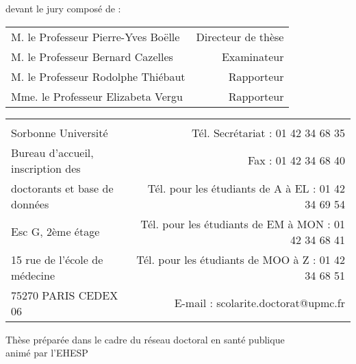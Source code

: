 \documentclass[a4paper,12pt]{book}
\numberwithin{equation}{chapter}
\numberwithin{figure}{chapter}
\numberwithin{table}{chapter}
\begin{document}
\vspace*{.6cm} 
devant le jury composé de : 
\vspace*{.1cm} 
\begin{center}

\begin{tabular}{p{10cm} r}
  M. le Professeur Pierre-Yves Boëlle & Directeur de thèse\\
  M. le Professeur Bernard Cazelles & Examinateur  \\
  M. le Professeur Rodolphe Thiébaut & Rapporteur  \\
  Mme. le Professeur Elizabeta Vergu & Rapporteur \\
\end{tabular}

\vspace{1cm}
{\footnotesize \begin{tabular}{p{6cm} r}
\hline \\[-1.5ex]
Sorbonne Université & Tél. Secrétariat : 01 42 34 68 35 \\
Bureau d’accueil, inscription des    & Fax : 01 42 34 68 40 \\
doctorants et base de données &Tél. pour les étudiants de A à EL : 01 42 34 69 54 \\
Esc G, 2ème étage &Tél. pour les étudiants de EM à MON : 01 42 34 68 41 \\
15 rue de l’école de médecine &Tél. pour les étudiants de MOO à Z : 01 42 34 68 51 \\
75270 PARIS CEDEX 06 & E-mail : scolarite.doctorat@upmc.fr \\
\end{tabular}}

\end{center}


\newpage

\vspace*{4cm}
\begin{center}
Thèse préparée dans le cadre du réseau doctoral en santé publique \\ animé par l’EHESP
\end{center}


\newpage

 

\tableofcontents

\listoffigures

\listoftables


\doublespacing
\mainmatter %
\end{document}
